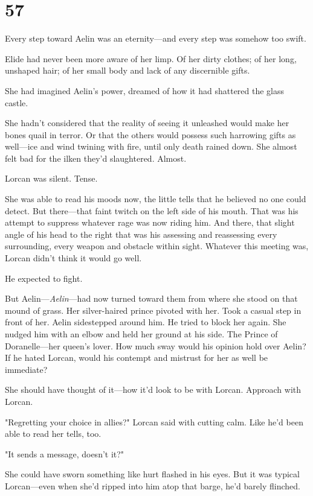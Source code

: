 
\chapter{57}

Every step toward Aelin was an eternity---and every step was somehow too swift.

Elide had never been more aware of her limp. Of her dirty clothes; of her long, unshaped hair; of her small body and lack of any discernible gifts.

She had imagined Aelin's power, dreamed of how it had shattered the glass castle.

She hadn't considered that the reality of seeing it unleashed would make her bones quail in terror. Or that the others would possess such harrowing gifts as well---ice and wind twining with fire, until only death rained down. She almost felt bad for the ilken they'd slaughtered. Almost.

Lorcan was silent. Tense.

She was able to read his moods now, the little tells that he believed no one could detect. But there---that faint twitch on the left side of his mouth. That was his attempt to suppress whatever rage was now riding him. And there, that slight angle of his head to the right  that was his assessing and reassessing every surrounding, every weapon and obstacle within sight. Whatever this meeting was, Lorcan didn't think it would go well.

He expected to fight.

But Aelin---\emph{Aelin}---had now turned toward them from where she stood on that mound of grass. Her silver-haired prince pivoted with her. Took a casual step in front of her. Aelin sidestepped around him. He tried to block her again. She nudged him with an elbow and held her ground at his side. The Prince of Doranelle---her queen's lover. How much sway would his opinion hold over Aelin? If he hated Lorcan, would his contempt and mistrust for her as well be immediate?

She should have thought of it---how it'd look to be with Lorcan. Approach with Lorcan.

"Regretting your choice in allies?" Lorcan said with cutting calm. Like he'd been able to read her tells, too.

"It sends a message, doesn't it?"

She could have sworn something like hurt flashed in his eyes. But it was typical Lorcan---even when she'd ripped into him atop that barge, he'd barely flinched.

